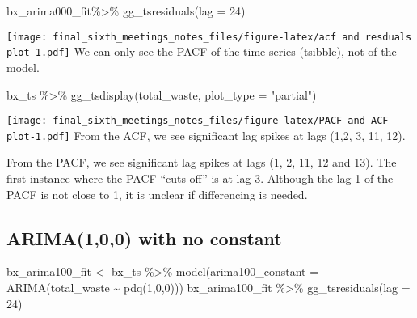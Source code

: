 \documentclass[
]{article}
\newenvironment{Shaded}{\begin{snugshade}}{\end{snugshade}}
\newcommand{\AttributeTok}[1]{\textcolor[rgb]{0.77,0.63,0.00}{#1}}
\newcommand{\DecValTok}[1]{\textcolor[rgb]{0.00,0.00,0.81}{#1}}
\newcommand{\FunctionTok}[1]{\textcolor[rgb]{0.00,0.00,0.00}{#1}}
\newcommand{\NormalTok}[1]{#1}
\newcommand{\OtherTok}[1]{\textcolor[rgb]{0.56,0.35,0.01}{#1}}
\newcommand{\SpecialCharTok}[1]{\textcolor[rgb]{0.00,0.00,0.00}{#1}}
\newcommand{\StringTok}[1]{\textcolor[rgb]{0.31,0.60,0.02}{#1}}
\begin{document}
\begin{Shaded}
\begin{Highlighting}[]
\NormalTok{bx\_arima000\_fit}\SpecialCharTok{\%\textgreater{}\%} \FunctionTok{gg\_tsresiduals}\NormalTok{(}\AttributeTok{lag =} \DecValTok{24}\NormalTok{)}
\end{Highlighting}
\end{Shaded}

\texttt{[image: final\_sixth\_meetings\_notes\_files/figure-latex/acf and resduals plot-1.pdf]}
We can only see the PACF of the time series (tsibble), not of the model.

\begin{Shaded}
\begin{Highlighting}[]
\NormalTok{bx\_ts }\SpecialCharTok{\%\textgreater{}\%} \FunctionTok{gg\_tsdisplay}\NormalTok{(total\_waste, }\AttributeTok{plot\_type =} \StringTok{"partial"}\NormalTok{)}
\end{Highlighting}
\end{Shaded}

\texttt{[image: final\_sixth\_meetings\_notes\_files/figure-latex/PACF and ACF plot-1.pdf]}
From the ACF, we see significant lag spikes at lags (1,2, 3, 11, 12).

From the PACF, we see significant lag spikes at lags (1, 2, 11, 12 and
13). The first instance where the PACF ``cuts off'' is at lag 3.
Although the lag 1 of the PACF is not close to 1, it is unclear if
differencing is needed.

\hypertarget{arima100-with-no-constant}{%
\subsection{ARIMA(1,0,0) with no
constant}\label{arima100-with-no-constant}}

\begin{Shaded}
\begin{Highlighting}[]
\NormalTok{bx\_arima100\_fit }\OtherTok{\textless{}{-}}\NormalTok{ bx\_ts }\SpecialCharTok{\%\textgreater{}\%} \FunctionTok{model}\NormalTok{(}\AttributeTok{arima100\_constant =} \FunctionTok{ARIMA}\NormalTok{(total\_waste }\SpecialCharTok{\textasciitilde{}}  \FunctionTok{pdq}\NormalTok{(}\DecValTok{1}\NormalTok{,}\DecValTok{0}\NormalTok{,}\DecValTok{0}\NormalTok{)))}
\NormalTok{bx\_arima100\_fit }\SpecialCharTok{\%\textgreater{}\%} \FunctionTok{gg\_tsresiduals}\NormalTok{(}\AttributeTok{lag =} \DecValTok{24}\NormalTok{)}
\end{Highlighting}
\end{Shaded}
\end{document}
